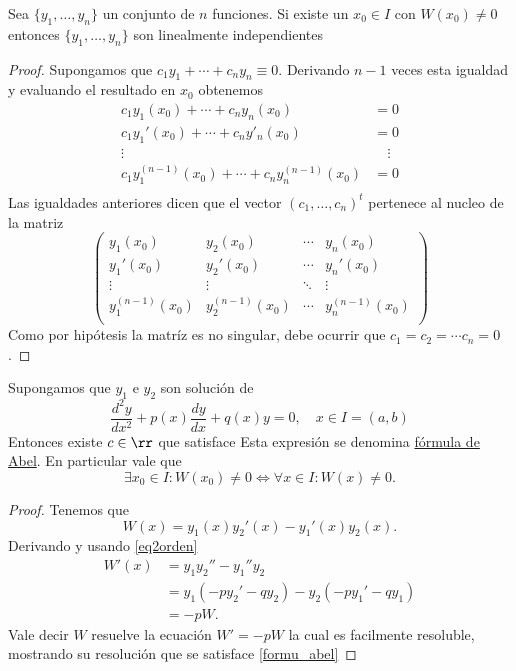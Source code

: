 \begin{lema}
 Sea $\{y_1,\ldots,y_n\}$ un conjunto de $n$ funciones. Si existe un $x_0\in I$ con $W(x_0)\neq 0$ entonces $\{y_1,\ldots,y_n\}$ son
linealmente independientes
\end{lema}


\begin{proof} Supongamos que $c_1y_1+\cdots+c_ny_n\equiv 0$. Derivando $n-1$ veces esta igualdad y evaluando el resultado en $x_0$ obtenemos
\[
\begin{split}
c_1y_1(x_0)+\cdots+c_ny_n(x_0)&=0\\
c_1y_1'(x_0)+\cdots+c_ny'_n(x_0)&=0\\
\vdots \quad& \quad\vdots\\
c_1y_1^{(n-1)}(x_0)+\cdots+c_ny^{(n-1)}_n(x_0)&=0\\
\end{split}
\]
Las igualdades anteriores dicen que el vector $(c_1,\ldots,c_n)^t$ pertenece al nucleo de la matriz
\[
\begin{pmatrix}
y_1(x_0) & y_2(x_0) & \cdots &y_n(x_0)\\
y_1'(x_0) & y_2'(x_0) & \cdots &y_n'(x_0)\\
\vdots & \vdots &\ddots& \vdots\\
y_1^{(n-1)}(x_0) & y_2^{(n-1)}(x_0) & \cdots &y_n^{(n-1)}(x_0)\\
\end{pmatrix}
\]
Como por hipótesis la matríz es no singular, debe ocurrir que $c_1=c_2=\cdots c_n=0$.
\end{proof}

\begin{teorema}{}
 Supongamos que $y_1$ e $y_2$ son solución de
\begin{equation}\label{eq2orden}\frac{d^2y}{dx^2}+p(x)\frac{dy}{dx}+q(x)y=0,\quad x\in I=(a,b)\end{equation}
Entonces existe $c\in\rr$ que satisface
Esta expresión se denomina \href{http://en.wikipedia.org/wiki/Abel's_identity}{fórmula de Abel}. En particular vale que
\[\exists x_0\in I: W(x_0)\neq 0 \Longleftrightarrow \forall x\in I: W(x)\neq 0 .\]
\end{teorema}

\begin{proof} Tenemos que
\[W(x)=y_1(x)y_2'(x)-y_1'(x)y_2(x).\]
Derivando y usando \eqref{eq2orden}
\[\begin{split}W'(x)&=y_1y_2''-y_1''y_2\\
&=y_1(-py_2'-qy_2)-y_2(-py_1'-qy_1)\\
&=-pW.
\end{split}
\]
Vale decir $W$ resuelve la ecuación $W'=-pW$ la cual es facilmente resoluble, mostrando su resolución que se satisface \eqref{formu_abel}
\end{proof}

